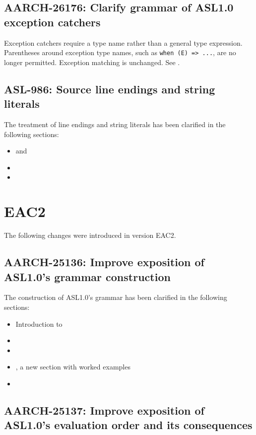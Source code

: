 \subsection*{AARCH-26176: Clarify grammar of ASL1.0 exception catchers}

Exception catchers require a type name rather than a general type expression.
Parentheses around exception type names, such as \lstinline{when (E) => ...}, are no longer permitted.
Exception matching is unchanged.
See .

\subsection*{ASL-986: Source line endings and string literals}

The treatment of line endings and string literals has been clarified in the following sections:
\begin{itemize}
  \item {} and 
  \item {}
  \item {}
\end{itemize}

\section*{EAC2}

The following changes were introduced in version EAC2.

\subsection*{AARCH-25136: Improve exposition of ASL1.0's grammar construction}

The construction of ASL1.0's grammar has been clarified in the following sections:
\begin{itemize}
  \item Introduction to 
  \item {}
  \item {}
  \item {}, a new section with worked examples
  \item {}
\end{itemize}

\subsection*{AARCH-25137: Improve exposition of ASL1.0's evaluation order and its consequences}

